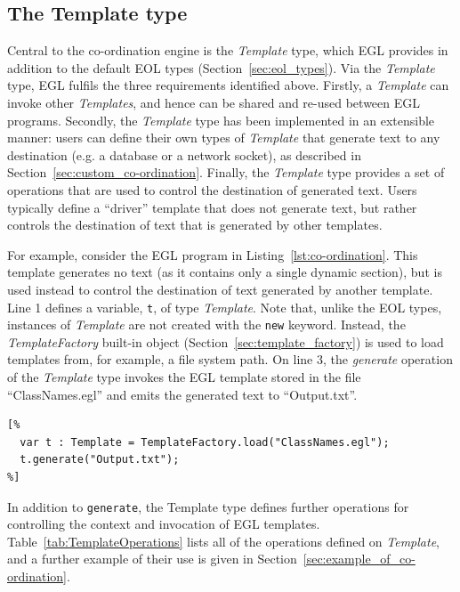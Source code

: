 \subsection{The Template type}
\label{sec:egl_template_type}
Central to the co-ordination engine is the \emph{Template} type, which EGL provides in addition to the default EOL types (Section~\ref{sec:eol_types}). Via the \emph{Template} type, EGL fulfils the three requirements identified above. Firstly, a \emph{Template} can invoke other \emph{Templates}, and hence can be shared and re-used between EGL programs. Secondly, the \emph{Template} type has been implemented in an extensible manner: users can define their own types of \emph{Template} that generate text to any destination (e.g. a database or a network socket), as described in Section~\ref{sec:custom_co-ordination}. Finally, the \emph{Template} type provides a set of operations that are used to control the destination of generated text. Users typically define a ``driver'' template that does not generate text, but rather controls the destination of text that is generated by other templates. 

For example, consider the EGL program in Listing~\ref{lst:co-ordination}. This template generates no text (as it contains only a single dynamic section), but is used instead to control the destination of text generated by another template. Line 1 defines a variable, \texttt{t}, of type \emph{Template}. Note that, unlike the EOL types, instances of \emph{Template} are not created with the \texttt{new} keyword. Instead, the \emph{TemplateFactory} built-in object (Section~\ref{sec:template_factory}) is used to load templates from, for example, a file system path. On line 3, the \emph{generate} operation of the \emph{Template} type invokes the EGL template stored in the file ``ClassNames.egl'' and emits the generated text to ``Output.txt''.

\begin{lstlisting}[float=tbp, caption=Storing the name of each Class to disk., label=lst:co-ordination, language=EGL]
[%
  var t : Template = TemplateFactory.load("ClassNames.egl");
  t.generate("Output.txt");
%]
\end{lstlisting}

In addition to \texttt{generate}, the Template type defines further operations for controlling the context and invocation of EGL templates. Table~\ref{tab:TemplateOperations} lists all of the operations defined on \emph{Template}, and a further example of their use is given in Section~\ref{sec:example_of_co-ordination}.

